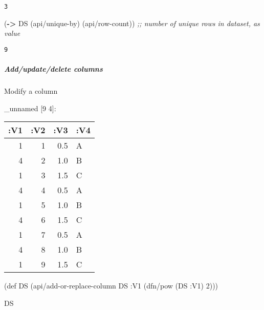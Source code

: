 \documentclass[]{article}
\newenvironment{Shaded}{\begin{snugshade}}{\end{snugshade}}
\newcommand{\KeywordTok}[1]{\textcolor[rgb]{0.13,0.29,0.53}{\textbf{#1}}}
\newcommand{\DecValTok}[1]{\textcolor[rgb]{0.00,0.00,0.81}{#1}}
\newcommand{\CommentTok}[1]{\textcolor[rgb]{0.56,0.35,0.01}{\textit{#1}}}
\newcommand{\FunctionTok}[1]{\textcolor[rgb]{0.00,0.00,0.00}{#1}}
\newcommand{\VariableTok}[1]{\textcolor[rgb]{0.00,0.00,0.00}{#1}}
\newcommand{\BuiltInTok}[1]{#1}
\newcommand{\AttributeTok}[1]{\textcolor[rgb]{0.77,0.63,0.00}{#1}}
\newcommand{\NormalTok}[1]{#1}
\let\oldsubparagraph\subparagraph
\renewcommand{\subparagraph}[1]{\oldsubparagraph{#1}\mbox{}}
\begin{document}
\begin{verbatim}
3
\end{verbatim}

\begin{Shaded}
\begin{Highlighting}[]
\NormalTok{(}\KeywordTok{->}\NormalTok{ DS}
\NormalTok{    (api/unique-by)}
\NormalTok{    (api/row-count)) }\CommentTok{;; number of unique rows in dataset, as value}
\end{Highlighting}
\end{Shaded}

\begin{verbatim}
9
\end{verbatim}

\subparagraph{Add/update/delete columns}\label{addupdatedelete-columns}

Modify a column

\begin{Shaded}
\end{Shaded}

\_unnamed {[}9 4{]}:

\begin{longtable}[]{@{}rrrl@{}}
\toprule
:V1 & :V2 & :V3 & :V4\tabularnewline
\midrule
\endhead
1 & 1 & 0.5 & A\tabularnewline
4 & 2 & 1.0 & B\tabularnewline
1 & 3 & 1.5 & C\tabularnewline
4 & 4 & 0.5 & A\tabularnewline
1 & 5 & 1.0 & B\tabularnewline
4 & 6 & 1.5 & C\tabularnewline
1 & 7 & 0.5 & A\tabularnewline
4 & 8 & 1.0 & B\tabularnewline
1 & 9 & 1.5 & C\tabularnewline
\bottomrule
\end{longtable}

\begin{Shaded}
\begin{Highlighting}[]
\NormalTok{(}\BuiltInTok{def}\FunctionTok{ DS }\NormalTok{(api/add-or-replace-column DS }\AttributeTok{:V1}\NormalTok{ (dfn/pow (DS }\AttributeTok{:V1}\NormalTok{) }\DecValTok{2}\NormalTok{)))}
\end{Highlighting}
\end{Shaded}

\begin{Shaded}
\begin{Highlighting}[]
\NormalTok{DS}
\end{Highlighting}
\end{Shaded}
\end{document}
